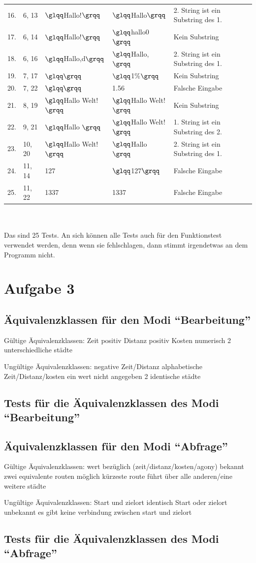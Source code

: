 \documentclass[a4paper]{report}
\begin{document}
\begin{tabular}{l|l|ll|l}
16.			& 6, 13				& $\glqq$Hallo!$\grqq$		& $\glqq$Hallo$\grqq$		& 2. String ist ein Substring des 1.\\
17.			& 6, 14				& $\glqq$Hallo!$\grqq$		& $\glqq$hallo0$\grqq$		& Kein Substring\\
18.			& 6, 16				& $\glqq$Hallo,d$\grqq$		& $\glqq$Hallo,$\grqq$		& 2. String ist ein Substring des 1.\\
19.			& 7, 17				& $\glqq \grqq$				& $\glqq$1\%$\grqq$			& Kein Substring\\
20.			& 7, 22				& $\glqq \grqq$				& 1.56						& Falsche Eingabe\\
21.			& 8, 19				& $\glqq$Hallo Welt!$\grqq$& $\glqq$Hallo Welt!$\grqq$& Kein Substring\\
22.			& 9, 21				& $\glqq$Hallo $\grqq$		& $\glqq$Hallo Welt!$\grqq$& 1. String ist ein Substring des 2.\\
23.			& 10, 20			& $\glqq$Hallo Welt!$\grqq$& $\glqq$Hallo $\grqq$		& 2. String ist ein Substring des 1.\\
24.			& 11, 14			& 127						& $\glqq$127$\grqq$			& Falsche Eingabe\\
25.			& 11, 22			& 1337						& 1337						& Falsche Eingabe\\
\end{tabular} \\ \\
Das sind 25 Tests. An sich können alle Tests auch für den Funktionstest verwendet werden, denn wenn sie fehlschlagen, dann stimmt irgendetwas an dem Programm nicht.
\newpage
\section*{Aufgabe 3}
\subsection*{Äquivalenzklassen für den Modi ``Bearbeitung''}
Gültige Äquivalenzklassen:
Zeit positiv
Distanz positiv
Kosten numerisch
2 unterschiedliche städte


Ungültige Äquivalenzklassen:
negative Zeit/Distanz
alphabetische Zeit/Distanz/kosten
ein wert nicht angegeben
2 identische städte

\subsection*{Tests für die Äquivalenzklassen des Modi ``Bearbeitung''}

\subsection*{Äquivalenzklassen für den Modi ``Abfrage''}
Gültige Äquivalenzklassen:
wert bezüglich (zeit/distanz/kosten/agony) bekannt
zwei equivalente routen möglich
kürzeste route führt über alle anderen/eine weitere städte

Ungültige Äquivalenzklassen:
Start und zielort identisch
Start oder zielort unbekannt
es gibt keine verbindung zwischen start und zielort

\subsection*{Tests für die Äquivalenzklassen des Modi ``Abfrage''}

\end{document}
